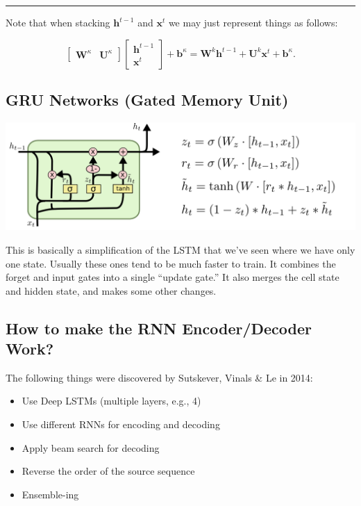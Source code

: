 \documentclass[a2paper,4pt]{extarticle}
\newcommand{\mat}[1]{\mathbf{#1}}
\renewcommand{\vec}[1]{\mathbf{#1}}
\newcommand{\vb}{\vec{b}}
\newcommand{\vh}{\vec{h}}
\newcommand{\vx}{\vec{x}}
\newcommand{\MU}{\mat{U}}
\newcommand{\MW}{\mat{W}}
\newcommand{\sep}{\vspace{0pt}\noindent\hrule\vspace{0pt}}
\newcommand{\sep}{\vspace{5pt}\noindent\hrule\vspace{5pt}}
\begin{document}
\begin{landscape}
\begin{multicols*}{7}
\sep

Note that when stacking $\vh^{t-1}$ and $\vx^t$ we may just represent things as
follows:

\[
\begin{bmatrix}
\MW^\kappa & \MU^\kappa
\end{bmatrix}
\begin{bmatrix}
\vh^{t-1}\\
\vx^{t}
\end{bmatrix}
+\vb^\kappa
=
\MW^k\vh^{t-1}+\MU^k\vx^t
+\vb^\kappa.
\]

\subsection{GRU Networks (Gated Memory Unit)}

\begin{center}
  \includegraphics[width=1\linewidth]{img/lstm-grus}
\end{center}

This is basically a simplification of the LSTM that we've seen where we have
only one state. Usually these ones tend to be much faster to train. It combines
the forget and input gates into a single ``update gate.'' It also merges the
cell state and hidden state, and makes some other changes.


\subsection{How to make the RNN Encoder/Decoder Work?}

The following things were discovered by Sutskever, Vinals \& Le in 2014:
\begin{itemize}
  \item Use Deep LSTMs (multiple layers, e.g., 4)
  \item Use different RNNs for encoding and decoding
  \item Apply beam search for decoding
  \item Reverse the order of the source sequence
  \item Ensemble-ing
\end{itemize} 



\end{multicols*}
\end{landscape}
\end{document}
